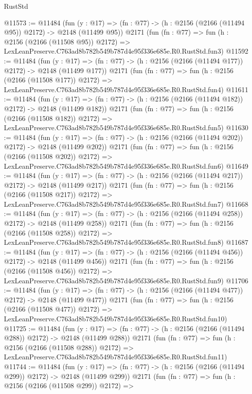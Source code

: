 \begin{lexlean}{RustStd}
\begin{coremodule}
@11573 := @11484
    (fun (y : @17) => (fn : @77) -> (h : @2156 (@2166 (@11494 @95)) @2172) -> @2148 (@11499 @95))
    @2171
    (fun (fn : @77) =>
    fun (h : @2156 (@2166 (@11508 @95)) @2172) =>
    LexLeanPreserve.C763ad8b782b549b787d4e95f336e685e.R0.RustStd.fun3)
@11592 := @11484
    (fun (y : @17) => (fn : @77) -> (h : @2156 (@2166 (@11494 @177)) @2172) -> @2148 (@11499 @177))
    @2171
    (fun (fn : @77) =>
    fun (h : @2156 (@2166 (@11508 @177)) @2172) =>
    LexLeanPreserve.C763ad8b782b549b787d4e95f336e685e.R0.RustStd.fun4)
@11611 := @11484
    (fun (y : @17) => (fn : @77) -> (h : @2156 (@2166 (@11494 @182)) @2172) -> @2148 (@11499 @182))
    @2171
    (fun (fn : @77) =>
    fun (h : @2156 (@2166 (@11508 @182)) @2172) =>
    LexLeanPreserve.C763ad8b782b549b787d4e95f336e685e.R0.RustStd.fun5)
@11630 := @11484
    (fun (y : @17) => (fn : @77) -> (h : @2156 (@2166 (@11494 @202)) @2172) -> @2148 (@11499 @202))
    @2171
    (fun (fn : @77) =>
    fun (h : @2156 (@2166 (@11508 @202)) @2172) =>
    LexLeanPreserve.C763ad8b782b549b787d4e95f336e685e.R0.RustStd.fun6)
@11649 := @11484
    (fun (y : @17) => (fn : @77) -> (h : @2156 (@2166 (@11494 @217)) @2172) -> @2148 (@11499 @217))
    @2171
    (fun (fn : @77) =>
    fun (h : @2156 (@2166 (@11508 @217)) @2172) =>
    LexLeanPreserve.C763ad8b782b549b787d4e95f336e685e.R0.RustStd.fun7)
@11668 := @11484
    (fun (y : @17) => (fn : @77) -> (h : @2156 (@2166 (@11494 @258)) @2172) -> @2148 (@11499 @258))
    @2171
    (fun (fn : @77) =>
    fun (h : @2156 (@2166 (@11508 @258)) @2172) =>
    LexLeanPreserve.C763ad8b782b549b787d4e95f336e685e.R0.RustStd.fun8)
@11687 := @11484
    (fun (y : @17) => (fn : @77) -> (h : @2156 (@2166 (@11494 @456)) @2172) -> @2148 (@11499 @456))
    @2171
    (fun (fn : @77) =>
    fun (h : @2156 (@2166 (@11508 @456)) @2172) =>
    LexLeanPreserve.C763ad8b782b549b787d4e95f336e685e.R0.RustStd.fun9)
@11706 := @11484
    (fun (y : @17) => (fn : @77) -> (h : @2156 (@2166 (@11494 @477)) @2172) -> @2148 (@11499 @477))
    @2171
    (fun (fn : @77) =>
    fun (h : @2156 (@2166 (@11508 @477)) @2172) =>
    LexLeanPreserve.C763ad8b782b549b787d4e95f336e685e.R0.RustStd.fun10)
@11725 := @11484
    (fun (y : @17) => (fn : @77) -> (h : @2156 (@2166 (@11494 @288)) @2172) -> @2148 (@11499 @288))
    @2171
    (fun (fn : @77) =>
    fun (h : @2156 (@2166 (@11508 @288)) @2172) =>
    LexLeanPreserve.C763ad8b782b549b787d4e95f336e685e.R0.RustStd.fun11)
@11744 := @11484
    (fun (y : @17) => (fn : @77) -> (h : @2156 (@2166 (@11494 @299)) @2172) -> @2148 (@11499 @299))
    @2171
    (fun (fn : @77) =>
    fun (h : @2156 (@2166 (@11508 @299)) @2172) =>

\end{coremodule}
\end{lexlean}
